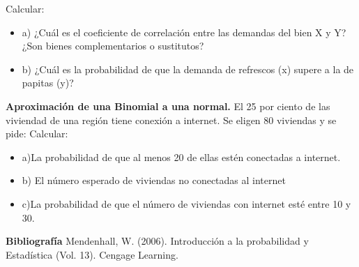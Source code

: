 \documentclass{oxmathproblems}
\begin{document}
\begin{questions}
Calcular:  
\begin{itemize}
\item  a) ¿Cuál es el coeficiente de correlación entre las demandas del bien X y Y? ¿Son bienes complementarios o sustitutos?
\item  b) ¿Cuál es la probabilidad de que la demanda de refrescos (x) supere a la de papitas (y)?
\end{itemize}

\miquestion \textbf {Aproximación de una Binomial a una normal. } El 25 por ciento de las viviendad de una región tiene conexión a internet. Se eligen 80 viviendas y se pide: 
Calcular:  
\begin{itemize}
\item  a)La probabilidad de que al menos 20 de ellas estén conectadas a internet. 
\item  b) El número esperado de viviendas no conectadas al internet 
\item  c)La probabilidad de que el número de viviendas con internet esté entre 10 y 30. 
\end{itemize}

\end{questions}

\textbf{Bibliografía}
Mendenhall, W. (2006). Introducción a la probabilidad y Estadística (Vol. 13). Cengage Learning.
\end{document}
